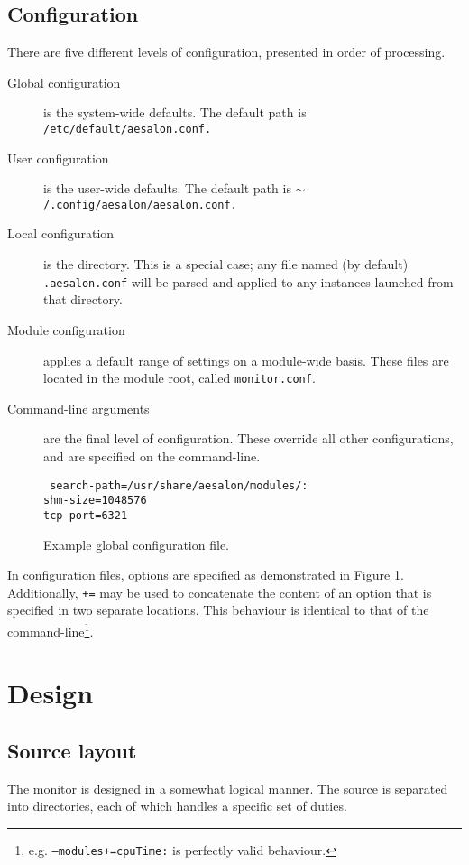 \documentclass[a4paper,10pt]{report}
\begin{document}
\subsection{Configuration}
There are five different levels of configuration, presented in order of processing.
\begin{description}
 \item[Global configuration] is the system-wide defaults. The default path is \texttt{/etc/default/aesalon.conf.}
 \item[User configuration] is the user-wide defaults. The default path is \texttt{$\sim$/.config/aesalon/aesalon.conf.}
 \item[Local configuration] is the directory. This is a special case; any file named (by default) \texttt{.aesalon.conf}
  will be parsed and applied to any instances launched from that directory.
 \item[Module configuration] applies a default range of settings on a module-wide basis. These files are located in the module root, 
  called \texttt{monitor.conf}.
 \item[Command-line arguments] are the final level of configuration. These override all other configurations, and are specified
  on the command-line.
\end{description}

\begin{figure}[h]
  \small{\texttt{%
search-path=/usr/share/aesalon/modules/: \\
shm-size=1048576 \\
tcp-port=6321
  }}
  \caption{Example global configuration file.\label{exampleconfigfile}}
\end{figure}

In configuration files, options are specified as demonstrated in Figure \ref{exampleconfigfile}. Additionally, \texttt{+=} may be used
to concatenate the content of an option that is specified in two separate locations. This behaviour is identical to that of the
command-line\footnote{e.g. \texttt{--modules+=cpuTime:} is perfectly valid behaviour.}.

\section{Design}
\subsection{Source layout}
The monitor is designed in a somewhat logical manner. The source is separated into directories, each of which handles a specific
set of duties.
\end{document}
